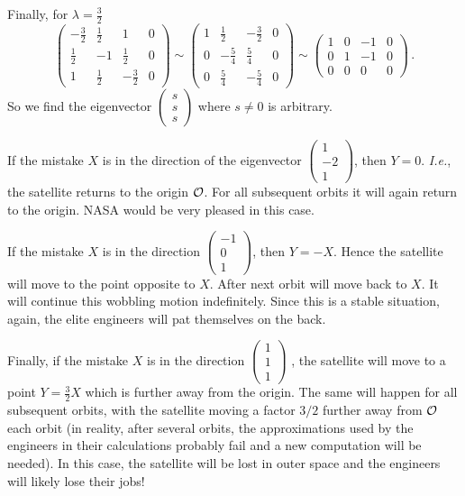 \begin{enumerate}
\begin{enumerate}
Finally, for $\lambda=\frac32$
$$
\left(
\begin{array}{ccc|c}
-\frac32&\frac12&1&0\\[1mm]
\frac12&-1&\frac12&0\\[1mm]
1&\frac12&-\frac32&0
\end{array}\right)
\sim
\left(
\begin{array}{ccc|c}
1&\frac12&-\frac32&0\\[1mm]
0&-\frac54&\frac54&0\\[1mm]
0&\frac54&-\frac54&0
\end{array}\right)
\sim
\left(
\begin{array}{ccc|c}
1&0&-1&0\\[1mm]
0&1&-1&0\\[1mm]
0&0&0&0
\end{array}\right)\, .
$$
So we find the eigenvector $\begin{pmatrix}s\\s\\s\end{pmatrix}$ where $s\neq 0$ is arbitrary.
\end{enumerate}
If the mistake $X$ is in the direction of the eigenvector $\begin{pmatrix}1\\-2\\1\end{pmatrix}$,
then $Y=0$. {\it I.e.}, the satellite returns to the origin ${\cal O}$. For all subsequent orbits it will again return to 
the origin. NASA would be very pleased in this case.

If the mistake $X$ is in the direction $\begin{pmatrix}-1\\0\\1\end{pmatrix}$, then $Y=-X$. Hence the satellite will move to the point opposite to $X$. After next orbit will move back to $X$. It will continue this wobbling
motion indefinitely. Since this is a stable situation, again, the elite engineers will pat themselves on the back.

Finally, if the mistake  $X$ is in the direction $\begin{pmatrix}1\\1\\1\end{pmatrix}$ , the satellite will move
to a point $Y=\frac32 X$ which is further away from the origin. The same will happen for all subsequent
orbits, with the satellite moving a factor $3/2$ further away from ${\cal O}$ each orbit (in reality, after
several orbits, the approximations used by the engineers in their calculations probably fail and a new computation  will be needed). In this case, the satellite will be lost in outer space and the engineers will likely lose their jobs!


\end{enumerate}
